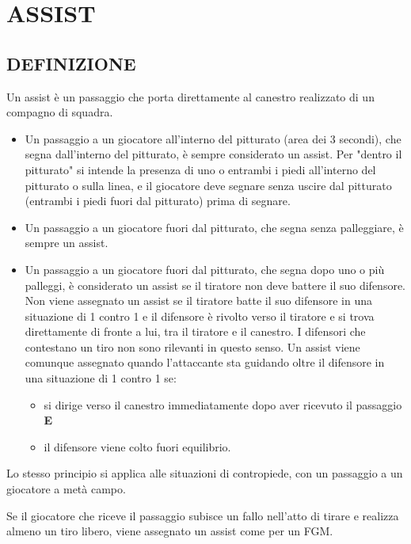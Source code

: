\section{ASSIST}\sectionline
\subsection{DEFINIZIONE}
\subsectionline

Un assist è un passaggio che porta direttamente al canestro realizzato di un compagno di squadra.

\begin{itemize}
    \item Un passaggio  a un giocatore all'interno del pitturato (area dei 3 secondi), che segna dall'interno del pitturato, è sempre considerato un assist. Per "dentro il pitturato" si intende la presenza di uno o entrambi i piedi all'interno del pitturato o sulla linea, e il giocatore deve segnare senza uscire dal pitturato (entrambi i piedi fuori dal pitturato) prima di segnare.
    \item Un passaggio a un giocatore fuori dal pitturato, che segna senza palleggiare, è sempre un assist.
    \item Un passaggio a un giocatore fuori dal pitturato, che segna dopo uno o più palleggi, è considerato un assist se il tiratore non deve battere il suo  difensore. Non viene assegnato un assist se il tiratore batte il suo difensore in una situazione di 1 contro 1 e il difensore è rivolto verso il tiratore e si  trova direttamente di fronte a lui, tra il tiratore e il canestro. I difensori che contestano un tiro non sono rilevanti in questo senso. Un assist viene comunque assegnato quando l'attaccante sta guidando oltre il difensore in una situazione di 1 contro 1 se:
    \begin{itemize}
        \item si dirige verso il canestro immediatamente dopo aver ricevuto il passaggio \textbf{E}
        \item il difensore viene colto fuori equilibrio.
    \end{itemize}
\end{itemize}

Lo stesso principio si applica alle situazioni di contropiede, con un passaggio a un giocatore a metà campo.

Se il giocatore che riceve il passaggio subisce un fallo nell'atto di tirare e realizza almeno un tiro libero, viene assegnato un assist come per un FGM.

